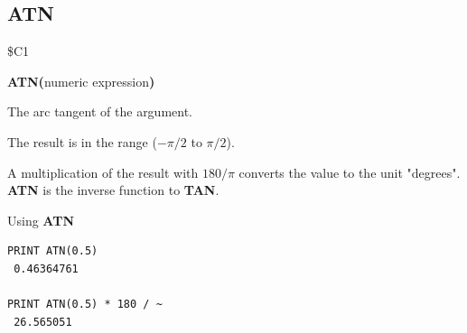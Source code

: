 \subsection{ATN}
\begin{description}[leftmargin=2cm,style=nextline]
\item [Token:]    \$C1

\item [Format:]   {\bf ATN(}numeric expression{\bf)}

\item [Returns:]  The arc tangent of the argument.

                  The result is in the range ($-\pi/2$ to $\pi/2$).

\item [Remarks:]  A multiplication of the result with $180/\pi$ converts the value to the unit "degrees". {\bf ATN} is the inverse function to {\bf TAN}.

\item [Examples:] Using {\bf ATN}

\begin{tcolorbox}[colback=black,coltext=white]
\verbatimfont{\codefont}
\begin{verbatim}
PRINT ATN(0.5)
 0.46364761

PRINT ATN(0.5) * 180 / ~
 26.565051
\end{verbatim}
\end{tcolorbox}
\end{description}


\newpage
